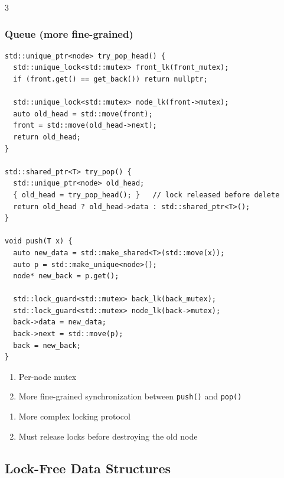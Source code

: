 \documentclass[12pt, a4paper]{article}
\begin{document}
\begin{multicols*}{3}
\subsubsection{Queue (more fine-grained)}
\begin{lstlisting}[basicstyle=\ttfamily\scriptsize]
std::unique_ptr<node> try_pop_head() {
  std::unique_lock<std::mutex> front_lk(front_mutex);
  if (front.get() == get_back()) return nullptr;

  std::unique_lock<std::mutex> node_lk(front->mutex);
  auto old_head = std::move(front);
  front = std::move(old_head->next);
  return old_head;
}

std::shared_ptr<T> try_pop() {
  std::unique_ptr<node> old_head;
  { old_head = try_pop_head(); }   // lock released before delete
  return old_head ? old_head->data : std::shared_ptr<T>();
}

void push(T x) {
  auto new_data = std::make_shared<T>(std::move(x));
  auto p = std::make_unique<node>();
  node* new_back = p.get();

  std::lock_guard<std::mutex> back_lk(back_mutex);
  std::lock_guard<std::mutex> node_lk(back->mutex);
  back->data = new_data;
  back->next = std::move(p);
  back = new_back;
}
\end{lstlisting}\vspace{-1em}
\begin{enumerate}[$+$]
  \item Per-node mutex
  \item More fine-grained synchronization between \lstinline|push()| and \lstinline|pop()|
\end{enumerate}
\begin{enumerate}[$-$]\vspace{-2pt}
  \item More complex locking protocol
  \item Must release locks before destroying the old node
\end{enumerate}
\colbreak

\subsection{Lock-Free Data Structures}
\lstset{style=cpp}


\end{multicols*}
\end{document}
